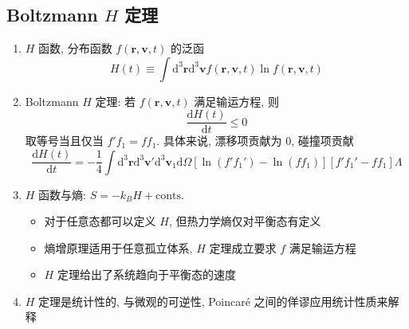 \documentclass[12pt,a4paper]{article}%
\numberwithin{equation}{section}
\renewcommand*{\vec}[1]{\bm{#1}}%
\newcommand{\dif}{\mathrm{d}}
\begin{document}
\subsection[Boltzmann H 定理]{Boltzmann $H$ 定理} %
\label{sub:boltzmann_h_theorem}
\begin{enumerate}
    \item $H$ 函数, 分布函数 $f(\vec r,\vec v, t)$ 的泛函
    \begin{equation}
        H(t) \equiv \int\dif^3\vec r\dif^3\vec v f(\vec r,\vec v, t)\ln f(\vec r,\vec v, t)
    \end{equation}
    \item Boltzmann $H$ 定理: 若 $f(\vec r,\vec v, t)$ 满足输运方程, 则
    \begin{equation}
        \frac{\dif H (t)}{\dif t}\le 0
    \end{equation}
    取等号当且仅当 $f'f_1 = ff_1$. 具体来说, 漂移项贡献为 $0$, 碰撞项贡献
    $$
    \frac{\dif H (t)}{\dif t} = -\frac 14 \int\dif^3\vec r\dif^3\vec v'\dif^3\vec v_1\dif\Omega\left[\ln(f'f_1')-\ln(ff_1)\right]\left[f'f_1' - ff_1\right]\Lambda
    $$
    \item $H$ 函数与熵: $S = -k_B H + \mbox{conts.}$
    \begin{itemize}
        \item 对于任意态都可以定义 $H$, 但热力学熵仅对平衡态有定义
        \item 熵增原理适用于任意孤立体系, $H$ 定理成立要求 $f$ 满足输运方程
        \item $H$ 定理给出了系统趋向于平衡态的速度
    \end{itemize}
    \item $H$ 定理是统计性的, 与微观的可逆性, Poincar\'e 之间的佯谬应用统计性质来解释
\end{enumerate}
\end{document}
